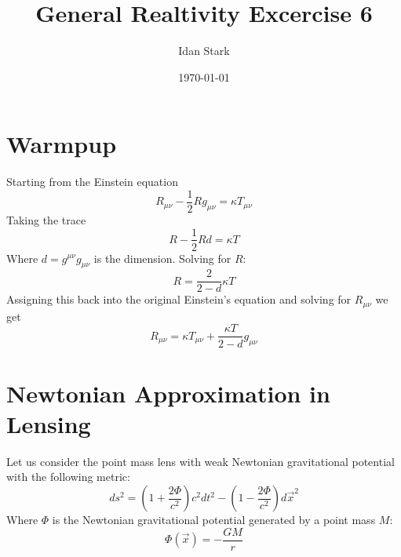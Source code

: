 \documentclass{article}
\title{General Realtivity Excercise 6}
\author{Idan Stark}
\date{\today}
\begin{document}
\maketitle

\section{Warmpup}
Starting from the Einstein equation
\begin{equation}
    R_{\mu\nu} - \frac{1}{2}Rg_{\mu\nu} = \kappa T_{\mu\nu}
\end{equation}
Taking the trace
\begin{equation}
    R - \frac{1}{2}Rd = \kappa T
\end{equation}
Where $d = g^{\mu\nu}g_{\mu\nu}$ is the dimension. Solving for $R$:
\begin{equation}
    R = \frac{2}{2 - d}\kappa T
\end{equation}
Assigning this back into the original Einstein's equation and solving for $R_{\mu\nu}$ we get
\begin{equation}
    R_{\mu\nu} = \kappa T_{\mu\nu} + \frac{\kappa T}{2 - d}g_{\mu\nu}
\end{equation}

\section{Newtonian Approximation in Lensing}
Let us consider the point mass lens with weak Newtonian gravitational potential with the following metric:
\begin{equation}
    ds^2 = \left(1 + \frac{2\Phi}{c^2}\right)c^2dt^2 - \left(1 - \frac{2\Phi}{c^2}\right)d\vec{x}^2
\end{equation}
Where $\Phi$ is the Newtonian gravitational potential generated by a point mass $M$:
\begin{equation}
    \Phi(\vec{x}) = -\frac{GM}{r}
\end{equation}
\end{document}
